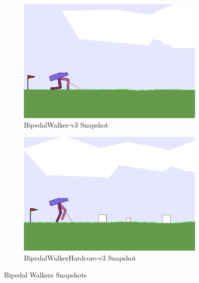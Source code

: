 \begin{figure}
	\begin{subfigure}{.5\textwidth}
		\centering
		\includegraphics[width=0.9\linewidth]{figures/bipedal/classic.png}
		\caption{BipedalWalker-v3 Snapshot~\cite{noauthor_bipedalwalker-v2_2021}}
		\label{fig:bipedal_walker_classic}
	\end{subfigure}
	\begin{subfigure}{.5\textwidth}
		\centering
		\includegraphics[width=0.9\linewidth]{figures/bipedal/hardcore.png}
		\caption{BipedalWalkerHardcore-v3 Snapshot~\cite{noauthor_bipedalwalkerhardcore-v2_2021}}
		\label{fig:bipedal_walker_hardcore}
	\end{subfigure}
	\caption{Bipedal Walkers Snapshots}
	\label{fig:bipedal_walkers}
\end{figure}

